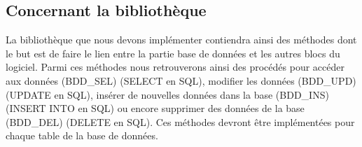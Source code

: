 \subsection{Concernant la bibliothèque}

La bibliothèque que nous devons implémenter contiendra ainsi des méthodes dont le but est de faire le lien entre la partie base de données et les autres blocs du logiciel. Parmi ces méthodes nous retrouverons ainsi des procédés pour accéder aux données (BDD_SEL) (SELECT en SQL), modifier les données (BDD_UPD) (UPDATE en SQL), insérer de nouvelles données dans la base (BDD_INS) (INSERT INTO en SQL) ou encore supprimer des données de la base (BDD_DEL) (DELETE en SQL). Ces méthodes devront être implémentées pour chaque table de la base de données.








